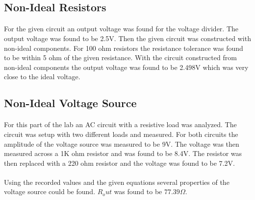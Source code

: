 \documentclass{article}
\begin{document}
\subsection*{Non-Ideal Resistors}
\paragraph{}
For the given circuit an output voltage was found for the voltage divider. The output voltage was found to be 2.5V. Then the given circuit was constructed with 
non-ideal components. For 100 ohm resistors the resistance tolerance was found to be within 5 ohm of the given resistance. With the circuit constructed from
non-ideal components the output voltage was found to be 2.498V which was very close to the ideal voltage.

\subsection*{Non-Ideal Voltage Source}
\paragraph{}
For this part of the lab an AC circuit with a resistive load was analyzed. The circuit was setup with two different loads and measured. For both circuits the 
amplitude of the voltage source was measured to be 9V. The voltage was then measured across a 1K ohm resistor and was found to be 8.4V. The resistor was then 
replaced with a 220 ohm resistor and the voltage was found to be 7.2V. 

\paragraph{}
Using the recorded values and the given equations several properties of the voltage source could be found. $R_out$ was found to be $77.39\Omega{}$.

\end{document}
